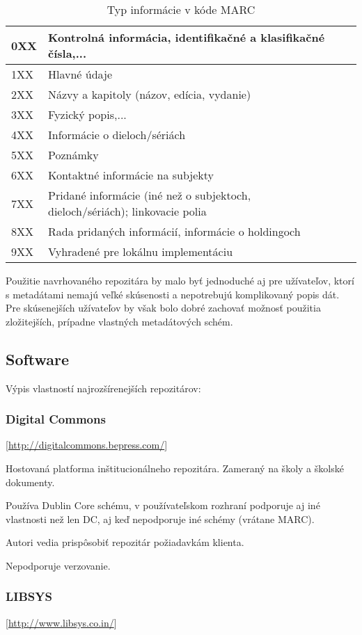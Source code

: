 \documentclass[thesis=M,slovak]{FITthesis}[2013/05/06]
\begin{document}
\begin{table}\centering
 	\caption[MARC]{Typ informácie v kóde MARC}\label{tab:marc}
 	\begin{tabular}{|l|l|c|c|}\hline
0XX	& Kontrolná informácia, identifikačné a klasifikačné čísla,...\tabularnewline \hline
1XX	& Hlavné údaje \tabularnewline \hline
2XX	& Názvy a kapitoly (názov, edícia, vydanie) \tabularnewline \hline
3XX	& Fyzický popis,... \tabularnewline \hline
4XX	& Informácie o dieloch/sériách \tabularnewline \hline
5XX	& Poznámky \tabularnewline \hline
6XX	& Kontaktné informácie na subjekty \tabularnewline \hline
7XX	& Pridané informácie (iné než o subjektoch, dieloch/sériách); linkovacie polia \tabularnewline \hline
8XX	& Rada pridaných informácií, informácie o holdingoch \tabularnewline \hline
9XX	& Vyhradené pre lokálnu implementáciu \tabularnewline \hline
 	\end{tabular}
 \end{table}


Použitie navrhovaného repozitára by malo byť jednoduché aj pre užívateľov, ktorí s metadátami nemajú veľké skúsenosti a nepotrebujú komplikovaný popis dát. Pre skúsenejších užívateľov by však bolo dobré zachovať možnosť použitia zložitejších, prípadne vlastných metadátových schém.

\subsection{Software}

Výpis vlastností najrozšírenejších repozitárov:

\subsubsection {Digital Commons}  [\url{http://digitalcommons.bepress.com/}]

Hostovaná platforma inštitucionálneho repozitára. Zameraný na školy a školské dokumenty.

Používa Dublin Core schému, v používateľskom rozhraní podporuje aj iné vlastnosti než len DC, aj keď nepodporuje iné schémy (vrátane MARC).

Autori vedia prispôsobiť repozitár požiadavkám klienta.

Nepodporuje verzovanie.

\subsubsection {LIBSYS}  [\url{http://www.libsys.co.in/}]
\end{document}
